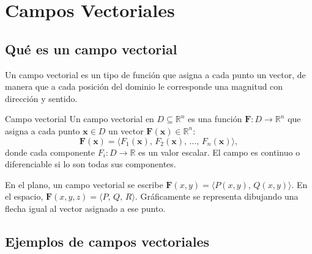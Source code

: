 \section{Campos Vectoriales}

\subsection{Qué es un campo vectorial}

Un campo vectorial es un tipo de función que asigna a cada punto un vector, de manera que a cada posición del dominio le corresponde una magnitud con dirección y sentido.

\begin{mydefinition}{Campo vectorial}
Un campo vectorial en $D \subseteq \mathbb{R}^n$ es una función $\mathbf{F}: D \to \mathbb{R}^n$ que asigna a cada punto $\mathbf{x} \in D$ un vector $\mathbf{F}(\mathbf{x}) \in \mathbb{R}^n$:
\[
\mathbf{F}(\mathbf{x}) = \bigl\langle F_1(\mathbf{x}),\, F_2(\mathbf{x}),\, \dots,\, F_n(\mathbf{x}) \bigr\rangle,
\]
donde cada componente $F_i: D \to \mathbb{R}$ es un valor escalar. El campo es continuo o diferenciable si lo son todas sus componentes.
\end{mydefinition}

En el plano, un campo vectorial se escribe $\mathbf{F}(x, y) = \langle P(x, y),\, Q(x, y) \rangle$. En el espacio, $\mathbf{F}(x, y, z) = \langle P,\, Q,\, R \rangle$. Gráficamente se representa dibujando una flecha igual al vector asignado a ese punto.

\begin{center}
\shorthandoff{>}
\end{center}

\subsection{Ejemplos de campos vectoriales}

